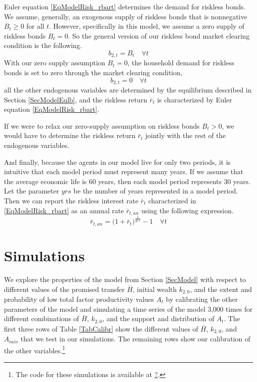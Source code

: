 \documentclass[letterpaper,12pt]{article}
\theoremstyle{definition}
\begin{document}
\begin{spacing}{1.5}
    Euler equation \eqref{EqModelRisk_rbart} determines the demand for riskless bonds. We assume, generally, an exogenous supply of riskless bonds that is nonnegative $B_t\geq 0$ for all $t$. However, specifically in this model, we assume a zero supply of riskless bonds $B_t=0$. So the general version of our riskless bond market clearing condition is the following.
    \begin{equation}\label{EqModelMC_B_gen}
      b_{2,t} = B_t \quad\forall t
    \end{equation}
    With our zero supply assumption $B_t = 0$, the household demand for riskless bonds is set to zero through the market clearing condition,
    \begin{equation}\label{EqModelMC_B_zero}
      b_{2,t} = 0 \quad\forall t
    \end{equation}
    all the other endogenous variables are determined by the equilibrium described in Section \ref{SecModelEqlb}, and the riskless return $\bar{r}_t$ is characterized by Euler equation \eqref{EqModelRisk_rbart}.

    If we were to relax our zero-supply assumption on riskless bonds $B_t>0$, we would have to determine the riskless return $\bar{r}_t$ jointly with the rest of the endogenous variables.

    And finally, because the agents in our model live for only two periods, it is intuitive that each model period must represent many years. If we assume that the average economic life is 60 years, then each model period represents 30 years. Let the parameter $yrs$ be the number of years represented in a model period. Then we can report the riskless interest rate $\bar{r}_t$ characterized in \eqref{EqModelRisk_rbart} as an annual rate $\bar{r}_{t,an}$ using the following expression.
    \begin{equation}\label{}
      \bar{r}_{t,an} = \bigl(1 + \bar{r}_t\bigr)^\frac{1}{yrs} - 1 \quad\forall t
    \end{equation}


\section{Simulations}\label{SecSims}

  We explore the properties of the model from Section \ref{SecModel} with respect to different values of the promised transfer $\bar{H}$, initial wealth $k_{2,0}$, and the extent and probability of low total factor productivity values $A_t$ by calibrating the other parameters of the model and simulating a time series of the model 3,000 times for different combinations of $\bar{H}$, $k_{2,0}$, and the support and distribution of $A_t$. The first three rows of Table \ref{TabCalibr} show the different values of $\bar{H}$, $k_{2,0}$, and $A_{min}$ that we test in our simulations. The remaining rows show our calibration of the other variables.\footnote{The code for these simulations is available at \href{?}{?}.}


\end{spacing}
\end{document}
